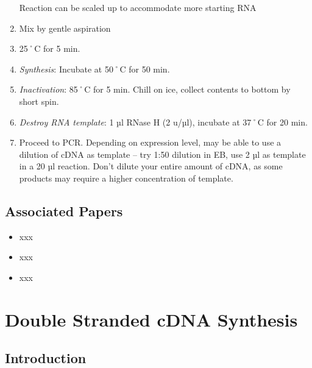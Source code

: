 \documentclass[
  letterpaper,
  DIV=11,
  numbers=noendperiod]{scrreprt}
\providecommand{\tightlist}{%
  \setlength{\itemsep}{0pt}\setlength{\parskip}{0pt}}\usepackage{longtable,booktabs,array}
\begin{document}
\begin{enumerate}
  \begin{tcolorbox}[enhanced jigsaw, rightrule=.15mm, title=\textcolor{quarto-callout-important-color}{\faExclamation}\hspace{0.5em}{NOTE}, titlerule=0mm, opacitybacktitle=0.6, toprule=.15mm, bottomrule=.15mm, opacityback=0, left=2mm, colframe=quarto-callout-important-color-frame, breakable, coltitle=black, colback=white, colbacktitle=quarto-callout-important-color!10!white, bottomtitle=1mm, leftrule=.75mm, toptitle=1mm, arc=.35mm]

  Reaction can be scaled up to accommodate more starting RNA

  \end{tcolorbox}
\item
  Mix by gentle aspiration
\item
  25˚C for 5 min.
\item
  \emph{Synthesis}: Incubate at 50˚C for 50 min.
\item
  \emph{Inactivation}: 85˚C for 5 min. Chill on ice, collect contents to
  bottom by short spin.
\item
  \emph{Destroy RNA template}: 1 µl RNase H (2 u/µl), incubate at 37˚C
  for 20 min.
\item
  Proceed to PCR. Depending on expression level, may be able to use a
  dilution of cDNA as template -- try 1:50 dilution in EB, use 2 µl as
  template in a 20 µl reaction. Don't dilute your entire amount of cDNA,
  as some products may require a higher concentration of template.
\end{enumerate}

\hypertarget{associated-papers-9}{%
\section{Associated Papers}\label{associated-papers-9}}

\begin{itemize}
\tightlist
\item
  xxx
\item
  xxx
\item
  xxx
\end{itemize}

\hypertarget{sec-molecular-dbl_strand_cDNA}{%
\chapter{Double Stranded cDNA
Synthesis}\label{sec-molecular-dbl_strand_cDNA}}

\hypertarget{introduction-12}{%
\section{Introduction}\label{introduction-12}}
\end{document}
